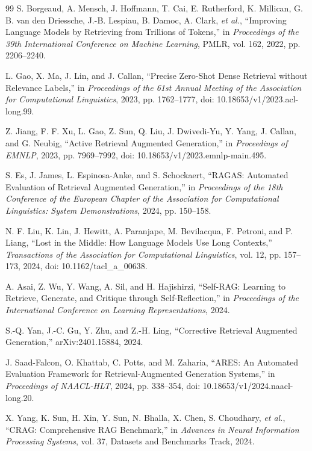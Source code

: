 \documentclass[conference]{IEEEtran}
\begin{document}
\begin{thebibliography}{99}
S. Borgeaud, A. Mensch, J. Hoffmann,
T. Cai, E. Rutherford, K. Millican,
G. B. van den Driessche, J.-B. Lespiau,
B. Damoc, A. Clark, \emph{et al.},
``Improving Language Models by Retrieving
from Trillions of Tokens,''
in \emph{Proceedings of the 39th International
Conference on Machine Learning},
PMLR, vol. 162, 2022,
pp. 2206--2240.

L. Gao, X. Ma, J. Lin, and J. Callan,
``Precise Zero-Shot Dense Retrieval without
Relevance Labels,''
in \emph{Proceedings of the 61st Annual
Meeting of the Association for Computational
Linguistics}, 2023, pp. 1762--1777,
doi: 10.18653/v1/2023.acl-long.99.

Z. Jiang, F. F. Xu, L. Gao, Z. Sun,
Q. Liu, J. Dwivedi-Yu, Y. Yang,
J. Callan, and G. Neubig,
``Active Retrieval Augmented Generation,''
in \emph{Proceedings of EMNLP}, 2023,
pp. 7969--7992,
doi: 10.18653/v1/2023.emnlp-main.495.

S. Es, J. James, L. Espinosa-Anke,
and S. Schockaert,
``RAGAS: Automated Evaluation of Retrieval
Augmented Generation,''
in \emph{Proceedings of the 18th Conference of the
European Chapter of the Association for
Computational Linguistics: System Demonstrations},
2024, pp. 150--158.

N. F. Liu, K. Lin, J. Hewitt, A. Paranjape,
M. Bevilacqua, F. Petroni, and P. Liang,
``Lost in the Middle: How Language Models
Use Long Contexts,''
\emph{Transactions of the Association for
Computational Linguistics}, vol. 12,
pp. 157--173, 2024,
doi: 10.1162/tacl\_a\_00638.

A. Asai, Z. Wu, Y. Wang, A. Sil,
and H. Hajishirzi,
``Self-RAG: Learning to Retrieve, Generate,
and Critique through Self-Reflection,''
in \emph{Proceedings of the International
Conference on Learning Representations},
2024.

S.-Q. Yan, J.-C. Gu, Y. Zhu,
and Z.-H. Ling,
``Corrective Retrieval Augmented Generation,''
arXiv:2401.15884, 2024.

J. Saad-Falcon, O. Khattab, C. Potts,
and M. Zaharia,
``ARES: An Automated Evaluation Framework
for Retrieval-Augmented Generation Systems,''
in \emph{Proceedings of NAACL-HLT}, 2024,
pp. 338--354,
doi: 10.18653/v1/2024.naacl-long.20.

X. Yang, K. Sun, H. Xin, Y. Sun,
N. Bhalla, X. Chen, S. Choudhary,
\emph{et al.},
``CRAG: Comprehensive RAG Benchmark,''
in \emph{Advances in Neural Information
Processing Systems}, vol. 37,
Datasets and Benchmarks Track, 2024.


\end{thebibliography}
\end{document}
